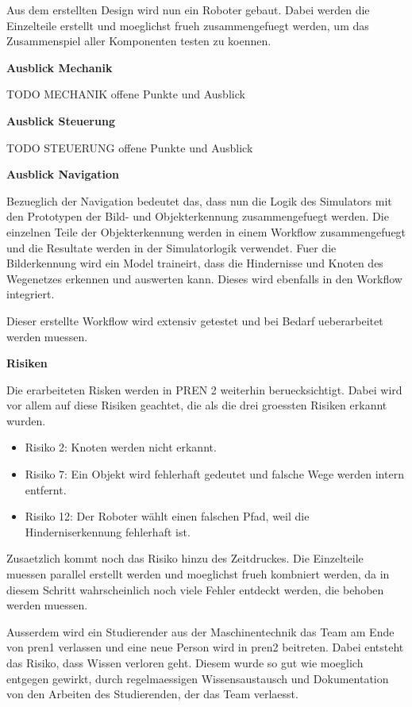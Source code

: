 Aus dem erstellten Design wird nun ein Roboter gebaut. Dabei werden die Einzelteile erstellt und moeglichst frueh zusammengefuegt werden, um das Zusammenspiel aller Komponenten testen zu koennen.

\textbf{Ausblick Mechanik}

TODO MECHANIK offene Punkte und Ausblick

\textbf{Ausblick Steuerung}

TODO STEUERUNG offene Punkte und Ausblick

\textbf{Ausblick Navigation}

Bezueglich der Navigation bedeutet das, dass nun die Logik des Simulators mit den Prototypen der Bild- und Objekterkennung zusammengefuegt werden. Die einzelnen Teile der Objekterkennung werden in einem Workflow zusammengefuegt und die Resultate werden in der Simulatorlogik verwendet. Fuer die Bilderkennung wird ein Model traineirt, dass die Hindernisse und Knoten des Wegenetzes erkennen und auswerten kann. Dieses wird ebenfalls in den Workflow integriert.

Dieser erstellte Workflow wird extensiv getestet und bei Bedarf ueberarbeitet werden muessen.

\textbf{Risiken}

Die erarbeiteten Risken werden in PREN 2 weiterhin beruecksichtigt. Dabei wird vor allem auf diese Risiken geachtet, die als die drei groessten Risiken erkannt wurden.

\begin{itemize}
    \item Risiko 2: Knoten werden nicht erkannt.
    \item Risiko 7: Ein Objekt wird fehlerhaft gedeutet und falsche Wege werden intern entfernt.
    \item Risiko 12: Der Roboter wählt einen falschen Pfad, weil die Hinderniserkennung fehlerhaft ist.
\end{itemize}

Zusaetzlich kommt noch das Risiko hinzu des Zeitdruckes. Die Einzelteile muessen parallel erstellt werden und moeglichst frueh kombniert werden, da in diesem Schritt wahrscheinlich noch viele Fehler entdeckt werden, die behoben werden muessen. 

Ausserdem wird ein Studierender aus der Maschinentechnik das Team am Ende von \acrshort{pren1} verlassen und eine neue Person wird in \acrshort{pren2} beitreten. Dabei entsteht das Risiko, dass Wissen verloren geht. Diesem wurde so gut wie moeglich entgegen gewirkt, durch regelmaessigen Wissensaustausch und Dokumentation von den Arbeiten des Studierenden, der das Team verlaesst.

